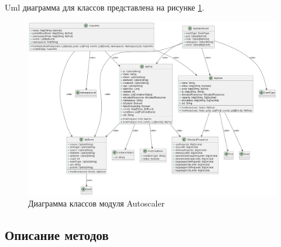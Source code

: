 Uml диаграмма для классов представлена на рисунке \ref{fig:uml3}.
\begin{figure}[h]
  \centering
  \includegraphics[scale=0.3]{img/7.png}
  \caption{Диаграмма классов модуля Autoscaler}
  \label{fig:uml3}
\end{figure}

\subsection{Описание методов}


